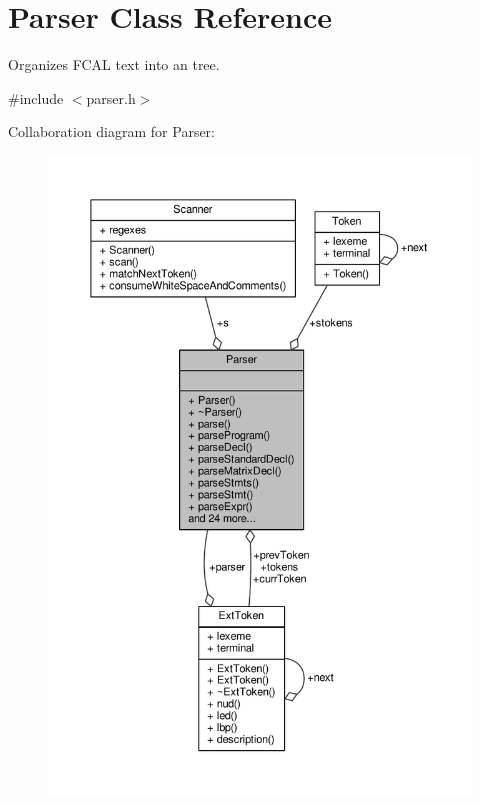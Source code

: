 \hypertarget{classParser}{\section{Parser Class Reference}
\label{classParser}
}


Organizes F\-C\-A\-L text into an tree.  




{\ttfamily \#include $<$parser.\-h$>$}



Collaboration diagram for Parser\-:\nopagebreak
\begin{figure}[H]
\begin{center}
\leavevmode
\includegraphics[width=350pt]{classParser__coll__graph}
\end{center}
\end{figure}
